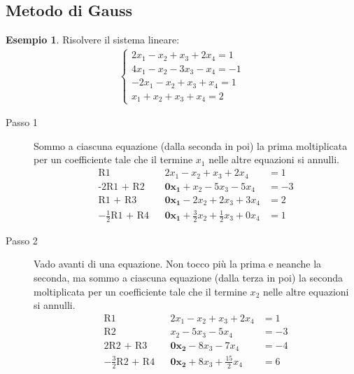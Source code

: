 \documentclass[a4paper]{article}
\theoremstyle{definition}
\newtheorem*{es}{Esempio}
\begin{document}
\subsection{Metodo di Gauss}
\begin{es}
	Risolvere il sistema lineare:
	\begin{align*}
		\begin{cases}
			2x_1 - x_2 + x_3 + 2x_4 = 1  \\
			4x_1 - x_2 - 3x_3 - x_4 = -1 \\
			- 2x_1 - x_2 + x_3 + x_4 = 1 \\
			x_1 + x_2 + x_3 + x_4 = 2
		\end{cases}
	\end{align*}

	\begin{description}
		\item[Passo 1] Sommo a ciascuna equazione (dalla seconda in poi) la prima moltiplicata per un coefficiente tale che il termine $x_1$ nelle altre equazioni si annulli.
		      \begin{align*}
			      \text{R1}                  &  & 2x_1 - x_2 + x_3 + 2x_4                                & = 1  \\
			      \text{-2R1 + R2}           &  & \mathbf{0x_1} + x_2 - 5x_3 - 5x_4                      & = -3 \\
			      \text{R1 + R3}             &  & \mathbf{0x_1} - 2x_2 + 2x_3 + 3x_4                     & = 2  \\
			      -\frac{1}{2}\text{R1 + R4} &  & \mathbf{0x_1} + \frac{3}{2}x_2 + \frac{1}{2}x_3 + 0x_4 & = 1
		      \end{align*}
		\item[Passo 2] Vado avanti di una equazione. Non tocco più la prima e neanche la seconda, ma sommo a ciascuna equazione (dalla terza in poi) la seconda moltiplicata per un coefficiente tale che il termine $x_2$ nelle altre equazioni si annulli.
		      \begin{align*}
			      \text{R1}                  &  & 2x_1 - x_2 + x_3 + 2x_4                & = 1   \\
			      \text{R2}                  &  & x_2 - 5x_3 - 5x_4                      & = -3  \\
			      \text{2R2 + R3}            &  & \mathbf{0x_2} - 8x_3 - 7x_4            & = - 4 \\
			      -\frac{3}{2}\text{R2 + R4} &  & \mathbf{0x_2} + 8x_3 + \frac{15}{2}x_4 & = 6
		      \end{align*}

\end{description}
\end{es}
\end{document}
